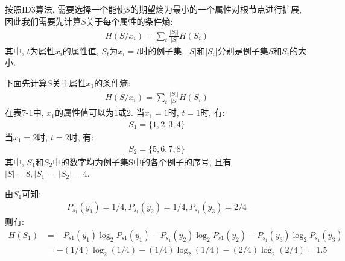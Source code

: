 按照ID3算法, 需要选择一个能使$S$的期望熵为最小的一个属性对根节点进行扩展, 因此我们需要先计算$S$关于每个属性的条件熵:
\begin{align}
  H\left(S / x_{i}\right)=\sum_{t} \frac{\left|S_{t}\right|}{|S|} H\left(S_{i}\right)
\end{align}
其中, $t$为属性$x_i$的属性值, $S_t$为$x_i=t$时的例子集, $|S|$和$|S_i|$分别是例子集$S$和$S_i$的大小.

下面先计算$S$关于属性$x_1$的条件熵:
\begin{align}
  H\left(S / x_{i}\right)=\sum_{t} \frac{\left|S_{t}\right|}{|S|} H\left(S_{i}\right)
\end{align}
在表7-1中, $x_1$的属性值可以为1或2. 当$x_1=1$时, $t=1$时, 有:
\begin{align}
  S_1=\{1, 2, 3, 4\}
\end{align}
当$x_1=2$时, $t=2$时, 有:
\begin{align}
  S_2=\{5, 6, 7, 8\}
\end{align}
其中, $S_1$和$S_2$中的数字均为例子集S中的各个例子的序号, 且有$|S|=8,|S_1|=|S_2|=4$.

由$S_1$可知:
\begin{align}
  P_{s_1}(y_1)=1/4,     P_{s_1}(y_2)=1/4,     P_{s_1}(y_3)=2/4
\end{align}
则有:
\begin{align}
H(S_1)&= - P_{s1}(y_1)\log_2 P_{s1}(y_1) - P_{s_1}(y_2)\log_2 P_{s1}(y_2 )- P_{s_1}(y_3)\log_2 P_{s_1}(y_3 )\\
     &= -(1/4)\log_2(1/4)- (1/4)\log_2(1/4)- (2/4)\log_2(2/4) =1.5
\end{align}

